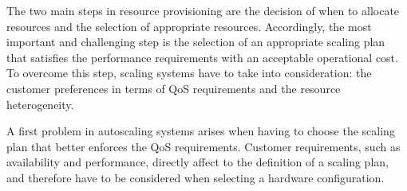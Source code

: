 \label{sec:motivation}

The two main steps in resource provisioning are the decision of when to allocate resources and the selection of appropriate resources.
Accordingly, the most important and challenging step is the selection of an appropriate scaling plan that satisfies the performance requirements with an acceptable operational cost. 
To overcome this step, scaling systems have to take into consideration: the customer preferences in terms of QoS requirements and the resource heterogeneity.

A first problem in autoscaling systems arises when having to choose the scaling plan that better enforces the QoS requirements. Customer requirements, such as availability and performance, directly affect to the definition of a scaling plan, and therefore have to be considered when selecting a hardware configuration.



